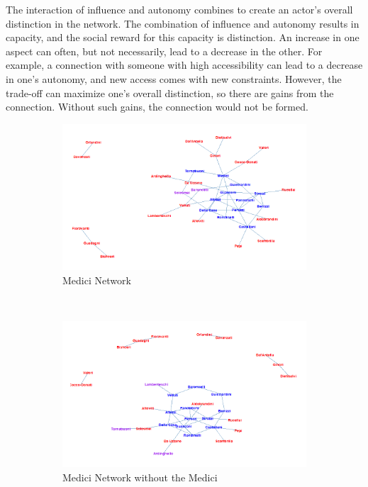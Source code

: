 \documentclass[12pt]{article}
\begin{document}
The interaction of influence and autonomy combines to create an actor’s overall distinction in the network. The combination of influence and autonomy results in capacity, and the social reward for this capacity is distinction. An increase in one aspect can often, but not necessarily, lead to a decrease in the other. For example, a connection with someone with high accessibility can lead to a decrease in one’s autonomy, and new access comes with new constraints. However, the trade-off can maximize one’s overall distinction, so there are gains from the connection. Without such gains, the connection would not be formed.

\begin{figure}
    \captionsetup[subfigure]{font=footnotesize,labelfont=footnotesize}
    \centering
     \begin{subfigure}[b]{0.6\textwidth}
        \includegraphics[width=1.0\textwidth]{Plots/medici.png}
            \caption{Medici Network}
            \label{fig:medici}
    \end{subfigure} \\
     \begin{subfigure}[b]{0.6\textwidth}
        \includegraphics[width=1.0\textwidth]{Plots/nomedici.png}
            \caption{Medici Network without the Medici}
            \label{fig:nomedici}
    \end{subfigure}
    \caption{}
    \label{fig:medici}
\end{figure}







\newpage


\newpage


\end{document}
